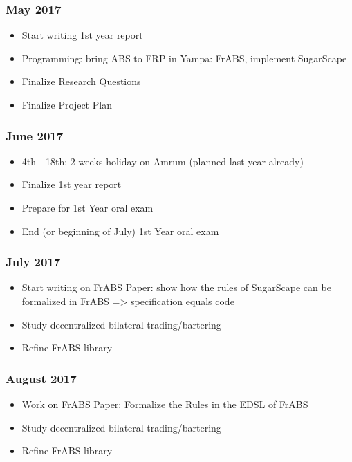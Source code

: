 \subsubsection{May 2017}
\begin{itemize}
	\item Start writing 1st year report
	\item Programming: bring ABS to FRP in Yampa: FrABS, implement SugarScape
	\item Finalize Research Questions
	\item Finalize Project Plan
\end{itemize}

\subsubsection{June 2017}
\begin{itemize}
	\item 4th - 18th: 2 weeks holiday on Amrum (planned last year already)
	\item Finalize 1st year report
	\item Prepare for 1st Year oral exam
	\item End (or beginning of July) 1st Year oral exam
\end{itemize}

\subsubsection{July 2017}
\begin{itemize}
	\item Start writing on FrABS Paper: show how the rules of SugarScape can be formalized in FrABS => specification equals code
	\item Study decentralized bilateral trading/bartering
	\item Refine FrABS library
\end{itemize}

\subsubsection{August 2017}
\begin{itemize}
	\item Work on FrABS Paper: Formalize the Rules in the EDSL of FrABS
	\item Study decentralized bilateral trading/bartering
	\item Refine FrABS library
\end{itemize}

